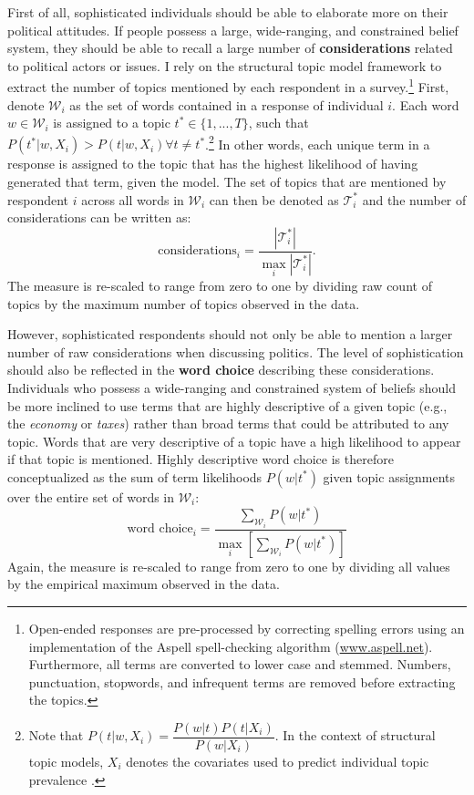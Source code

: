 \documentclass[12pt]{article}
\begin{document}
First of all, sophisticated individuals should be able to elaborate more on their political attitudes. If people possess a large, wide-ranging, and constrained belief system, they should be able to recall a large number of \textbf{considerations} related to political actors or issues. I rely on the structural topic model framework \citep{roberts2014structural} to extract the number of topics mentioned by each respondent in a survey.\footnote{Open-ended responses are pre-processed by correcting spelling errors using an implementation of the Aspell spell-checking algorithm (\url{www.aspell.net}). Furthermore, all terms are converted to lower case and stemmed. Numbers, punctuation, stopwords, and infrequent terms are removed before extracting the topics.} First, denote $\mathcal{W}_i$ as the set of words contained in a response of individual $i$. Each word $w\in\mathcal{W}_i$ is assigned to a topic $t^* \in \{1,...,T\} $, such that $P(t^*|w,X_i) > P(t|w,X_i) \forall t\neq t^*$.\footnote{Note that $P(t|w,X_i)=\dfrac{P(w|t)P(t|X_i)}{P(w|X_i)}$. In the context of structural topic models, $X_i$ denotes the covariates used to predict individual topic prevalence \citep[see][for details]{roberts2014structural}.} In other words, each unique term in a response is assigned to the topic that has the highest likelihood of having generated that term, given the model. The set of topics that are mentioned by respondent $i$ across all words in $\mathcal{W}_i$ can then be denoted as $\mathcal{T}^*_i$ and the number of considerations can be written as:
\begin{equation}
\text{considerations}_i = \dfrac{|\mathcal{T}^*_i|}{\max_i|\mathcal{T}^*_i|}.
\end{equation}
The measure is re-scaled to range from zero to one by dividing raw count of topics by the maximum number of topics observed in the data.

However, sophisticated respondents should not only be able to mention a larger number of raw considerations when discussing politics. The level of sophistication should also be reflected in the \textbf{word choice} describing these considerations. Individuals who possess a wide-ranging and constrained system of beliefs should be more inclined to use terms that are highly descriptive of a given topic (e.g., the \textit{economy} or \textit{taxes}) rather than broad terms that could be attributed to any topic. Words that are very descriptive of a topic have a high likelihood to appear if that topic is mentioned. Highly descriptive word choice is therefore conceptualized as the sum of term likelihoods $P(w|t^*)$ given topic assignments over the entire set of words in $\mathcal{W}_i$:
\begin{equation}
\text{word choice}_i = \dfrac{\sum_{\mathcal{W}_i} P(w|t^*)}{\max_i\left[\sum_{\mathcal{W}_i} P(w|t^*)\right]}
\end{equation}
Again, the measure is re-scaled to range from zero to one by dividing all values by the empirical maximum observed in the data.
\end{document}
